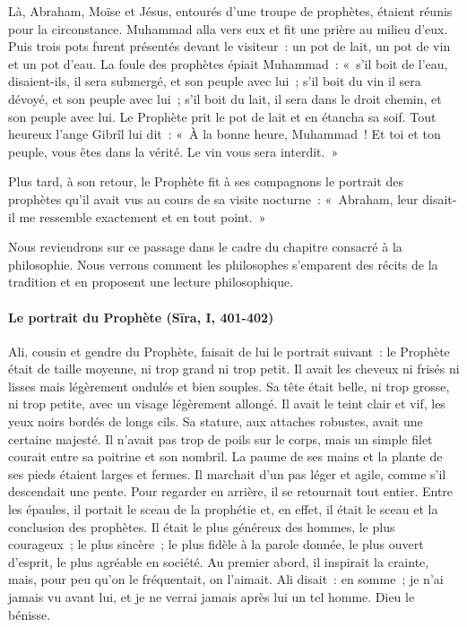 {Là, Abraham, Moïse et Jésus, entourés d'une troupe de prophètes,
étaient réunis pour la circonstance. Muhammad alla vers eux et fit une
prière au milieu d'eux. Puis trois pots furent présentés devant le
visiteur~: un pot de lait, un pot de vin et un pot d'eau. La foule des
prophètes épiait Muhammad~: «~s'il boit de l'eau, disaient-ils, il sera
submergé, et son peuple avec lui~; s'il boit du vin il sera dévoyé, et
son peuple avec lui~; s'il boit du lait, il sera dans le droit chemin,
et son peuple avec lui. Le Prophète prit le pot de lait et en étancha sa
soif. Tout heureux l'ange Gibrîl lui dit~: «~À la bonne heure,
Muhammad~! Et toi et ton peuple, vous êtes dans la vérité. Le vin vous
sera interdit.~»}

{Plus tard, à son retour, le Prophète fit à ses compagnons le
portrait des prophètes qu'il avait vus au cours de sa visite nocturne~:
«~Abraham, leur disait-il me ressemble exactement et en tout point.~»}

Nous reviendrons sur ce passage dans le cadre du chapitre consacré à la
philosophie. Nous verrons comment les philosophes s'emparent des récits
de la tradition et en proposent une lecture philosophique.


\paragraph{Le portrait du Prophète (Sīra, I,
401-402)}

{Ali, cousin et gendre du Prophète, faisait de lui le portrait
suivant~: le Prophète était de taille moyenne, ni trop grand ni trop
petit. Il avait les cheveux ni frisés ni lisses mais légèrement ondulés
et bien souples. Sa tête était belle, ni trop grosse, ni trop petite,
avec un visage légèrement allongé. Il avait le teint clair et vif, les
yeux noirs bordés de longs cils. Sa stature, aux attaches robustes,
avait une certaine majesté. Il n'avait pas trop de poils sur le corps,
mais un simple filet courait entre sa poitrine et son nombril. La paume
de ses mains et la plante de ses pieds étaient larges et fermes. Il
marchait d'un pas léger et agile, comme s'il descendait une pente. Pour
regarder en arrière, il se retournait tout entier. Entre les épaules, il
portait le sceau de la prophétie et, en effet, il était le sceau et la
conclusion des prophètes. Il était le plus généreux des hommes, le plus
courageux~; le plus sincère~; le plus fidèle à la parole donnée, le plus
ouvert d'esprit, le plus agréable en société. Au premier abord, il
inspirait la crainte, mais, pour peu qu'on le fréquentait, on l'aimait.
Ali disait~: en somme~; je n'ai jamais vu avant lui, et je ne verrai
jamais après lui un tel homme. Dieu le bénisse.}



